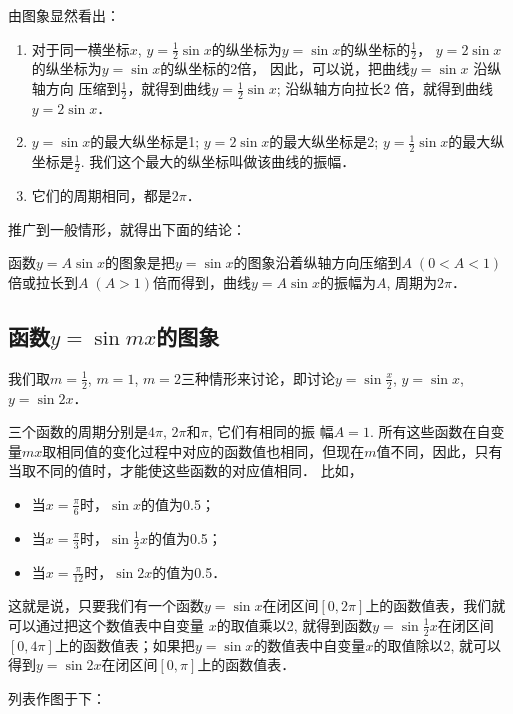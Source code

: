 由图象显然看出：
\begin{enumerate}
    \item 对于同一横坐标$x$, $y=\frac{1}{2}\sin x$的纵坐标为$y=\sin x$的纵坐标的$\frac{1}{2}$，
    $y=2\sin x$的纵坐标为$y=\sin x$的纵坐标的2倍，
    因此，可以说，把曲线$y=\sin x$ 沿纵轴方向
    压缩到$\frac{1}{2}$，就得到曲线$y=\frac{1}{2}\sin x$; 沿纵轴方向拉长2
倍，就得到曲线$y=2\sin x$．

\item $y=\sin x$的最大纵坐标是1; $y=2\sin x$的最大纵坐标是2; $y=\frac{1}{2}\sin x$的最大纵坐标是$\frac{1}{2}$. 我们这个最大的纵坐标叫做该曲线的振幅．
\item 它们的周期相同，都是$2\pi$．
\end{enumerate}

推广到一般情形，就得出下面的结论：

\begin{blk}{}
    函数$y=A\sin x$的图象是把$y=\sin x$的图象沿着纵轴方向压缩到$A\; (0<A<1)$倍或拉长到$A\; (A>1)$倍而得到，曲线$y=A\sin x$的振幅为$A$, 周期为$2\pi$．
\end{blk}

\subsection{函数$y=\sin mx$的图象}

我们取$m=\frac{1}{2}$, $m=1$, $m=2$三种情形来讨论，即讨论$y=\sin\frac{x}{2}$, $y=\sin x$, $y=\sin2x$．

三个函数的周期分别是$4\pi$, $2\pi$和$\pi$, 它们有相同的振
幅$A=1$. 所有这些函数在自变量$mx$取相同值的变化过程中对应的函数值也相同，但现在$m$值不同，因此，只有当取不同的值时，才能使这些函数的对应值相同．
比如，
\begin{itemize}
    \item 当$x=\frac{\pi}{6}$时，$\sin x$的值为0.5；
    \item 当$x=\frac{\pi}{3}$时，$\sin \frac{1}{2}x$的值为0.5；
    \item 当$x=\frac{\pi}{12}$时，$\sin 2x$的值为0.5．
\end{itemize}

这就是说，只要我们有一个函数$y=\sin x$在闭区间$[0,2\pi]$上的函数值表，我们就可以通过把这个数值表中自变量
$x$的取值乘以2, 就得到函数$y=\sin\frac{1}{2}x$在闭区间$[0,4\pi]$上的函数值表；如果把$y=\sin x$的数值表中自变量$x$的取值除以2, 就可以得到$y=\sin 2x$在闭区间$[0,\pi]$上的函数值表．

列表作图于下：

